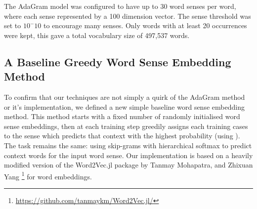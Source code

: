 \documentclass{sig-alternate}
\begin{document}

The AdaGram model was configured to have up to 30 word senses per word, where each sense represented by a 100 dimension vector. The sense threshold was set to $10^-10$ to encourage many senses.
Only words with at least 20 occurrences were kept, this gave a total vocabulary size of 497,537 words.





\subsection{A Baseline Greedy Word Sense Embedding Method}

To confirm that our techniques are not simply a quirk of the AdaGram method or it's implementation, we defined a new simple baseline word sense embedding method.
This method starts with a fixed number of randomly initialised word sense embeddings, then at each training step greedily assigns each training cases to the sense which predicts that context with the highest probability (using ). The task remains the same: using skip-grams with hierarchical softmax to predict context words for the input word sense.
Our implementation is based on a heavily modified version of the Word2Vec.jl package by Tanmay Mohapatra, and Zhixuan Yang \footnote{\url{https://github.com/tanmaykm/Word2Vec.jl/}} for word embeddings.
\end{document}
